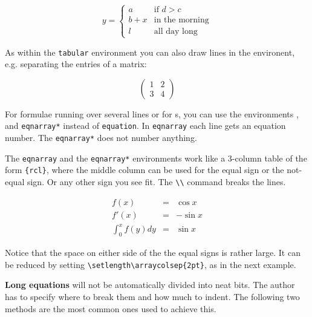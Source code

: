 \begin{example}
\begin{displaymath}
y = \left\{ \begin{array}{ll}
 a & \textrm{if $d>c$}\\
 b+x & \textrm{in the morning}\\
 l & \textrm{all day long}
  \end{array} \right.
\end{displaymath}
\end{example}

As within the \verb|tabular| environment you can also
draw lines in the  environent, e.g. separating the entries of
a matrix:

\begin{example}
\begin{displaymath}
\left(\begin{array}{c|c}
 1 & 2 \\
\hline
3 & 4
\end{array}\right)
\end{displaymath}
\end{example}



For formulae running over several lines or for s,
you can use the environments , and \verb|eqnarray*|
instead of \texttt{equation}. In \texttt{eqnarray} each line gets an
equation number. The \verb|eqnarray*| does not number anything.

The \texttt{eqnarray} and the \verb|eqnarray*| environments work like
a 3-column table of the form \verb|{rcl}|, where the middle column can
be used for the equal sign or the not-equal sign. Or any other sign
you see fit. The \verb|\\| command breaks the lines.

\begin{example}
\begin{eqnarray}
f(x) & = & \cos x     \\
f'(x) & = & -\sin x   \\
\int_{0}^{x} f(y)dy &
 = & \sin x
\end{eqnarray}
\end{example}

\noindent Notice that the space on either side of the 
the equal signs is rather large. It can be reduced by setting
\verb|\setlength\arraycolsep{2pt}|, as in the next example.

 \textbf{Long equations} will not be
automatically divided into neat bits.  The author has to specify
where to break them and how much to indent. The following two methods
are the most common ones used to achieve this.

